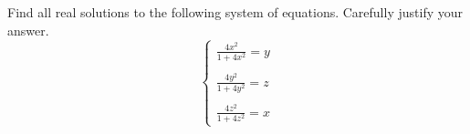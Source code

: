 Find all real solutions to the following system of equations.  Carefully justify your answer.\[ \left\{ \begin{array}{c} \displaystyle\frac{4x^2}{1+4x^2} = y \\ \\ \displaystyle\frac{4y^2}{1+4y^2} = z \\ \\ \displaystyle\frac{4z^2}{1+4z^2} = x \end{array} \right. \]